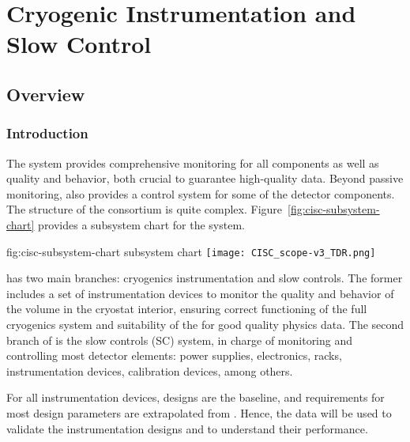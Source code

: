 \chapter{Cryogenic Instrumentation and Slow Control}
\label{ch:sp-cisc}

\section{Overview} 

\subsection{Introduction}



The  system provides comprehensive monitoring for all  components as well as \lar quality and behavior, both crucial to guarantee high-quality data. Beyond passive monitoring,  also provides a control system for some of the detector components. The structure of the  consortium is quite
complex. Figure~\ref{fig:cisc-subsystem-chart} provides a subsystem chart for the  system. 

\begin{dunefigure}{fig:cisc-subsystem-chart}
  { subsystem chart}
  \texttt{[image: CISC\_scope-v3\_TDR.png]}
\end{dunefigure}

 has two main branches: cryogenics instrumentation and slow controls. The former includes a set of instrumentation devices to monitor the quality and behavior of the \lar volume in the cryostat interior, ensuring correct functioning of the full cryogenics system and suitability of the \lar for good quality physics data. The second branch of  is the slow controls (SC) system, in charge of monitoring and controlling most detector elements: power supplies, electronics, racks, instrumentation devices, calibration devices, among others. 

For all \lar instrumentation devices,  designs are
the baseline, and requirements for most design
parameters are extrapolated from . Hence, the  data will be used to validate the instrumentation designs and to understand their performance.

